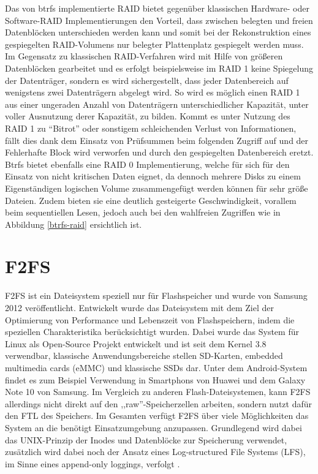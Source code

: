 \documentclass[11pt]{article}
\begin{document}
\par{
Das von btrfs implementierte RAID bietet gegenüber klassischen Hardware- oder Software-RAID Implementierungen den Vorteil, dass zwischen belegten und freien Datenblöcken unterschieden werden kann und somit bei der Rekonstruktion eines gespiegelten RAID-Volumens nur belegter Plattenplatz gespiegelt werden muss. Im Gegensatz zu klassischen RAID-Verfahren wird mit Hilfe von größeren Datenblöcken gearbeitet und es erfolgt beispielsweise im RAID 1 keine Spiegelung der Datenträger, sondern es wird sichergestellt, dass jeder Datenbereich auf wenigstens zwei Datenträgern abgelegt wird. So wird es möglich einen RAID 1 aus einer ungeraden Anzahl von Datenträgern unterschiedlicher Kapazität, unter voller Ausnutzung derer Kapazität, zu bilden. Kommt es unter Nutzung des RAID 1 zu \enquote{Bitrot} oder sonstigem schleichenden Verlust von Informationen, fällt dies dank dem Einsatz von Prüfsummen beim folgenden Zugriff auf und der Fehlerhafte Block wird verworfen und durch den gespiegelten Datenbereich eretzt. Btrfs bietet ebenfalls eine RAID 0 Implementierung, welche für sich für den Einsatz von nicht kritischen Daten eignet, da dennoch mehrere Disks zu einem Eigenständigen logischen Volume zusammengefügt werden können für sehr größe Dateien. Zudem bieten sie eine deutlich gesteigerte Geschwindigkeit, vorallem beim sequentiellen Lesen, jedoch auch bei den wahlfreien Zugriffen wie in Abbildung \ref{btrfs-raid} ersichtlich ist.}

\newpage
\section{F2FS}
\label{F2FS}
F2FS ist ein Dateisystem speziell nur für Flashspeicher und wurde von Samsung 2012 veröffentlicht. Entwickelt wurde das Dateisystem mit dem Ziel der Optimierung von Performance und Lebenszeit von Flashspeichern, indem die speziellen Charakteristika berücksichtigt wurden. Dabei wurde das System für Linux als Open-Source Projekt entwickelt und ist seit dem Kernel 3.8 verwendbar, klassische Anwendungsbereiche stellen SD-Karten, embedded multimedia cards (eMMC) und klassische SSDs dar. Unter dem Android-System findet es zum Beispiel Verwendung in Smartphons von Huawei und dem Galaxy Note 10 von Samsung. Im Vergleich zu anderen Flash-Dateisystemen, kann F2FS allerdings nicht direkt auf den ,,raw''-Speicherzellen arbeiten, sondern nutzt dafür den FTL des Speichers. Im Gesamten verfügt F2FS über viele Möglichkeiten das System an die benötigt Einsatzumgebung anzupassen. Grundlegend wird dabei das UNIX-Prinzip der Inodes und Datenblöcke zur Speicherung verwendet, zusätzlich wird dabei noch der Ansatz eines Log-structured File Systems (LFS), im Sinne eines append-only loggings, verfolgt \cite{lee2015f2fs}.
\end{document}
